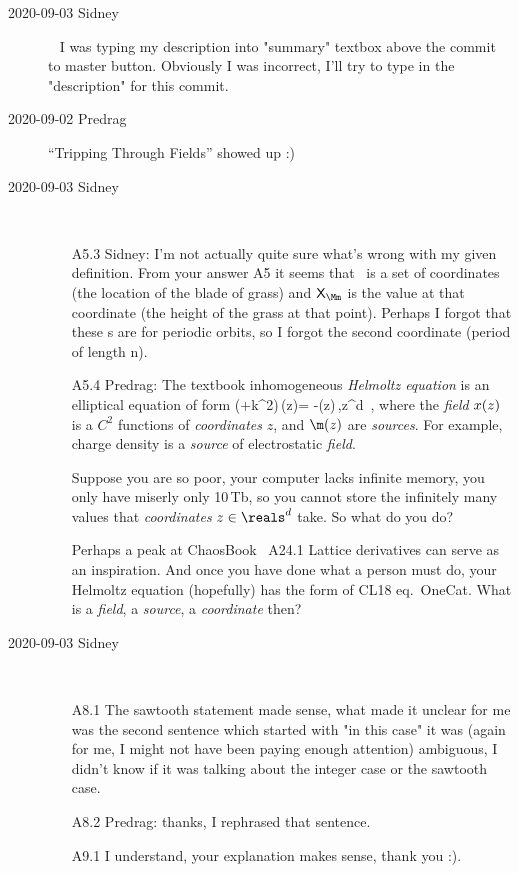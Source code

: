 \begin{description}
\item[2020-09-03 Sidney]~
I was typing my description into "summary" textbox above the commit to
master button. Obviously I was incorrect, I'll try to type in the
"description" for this commit.

\item[2020-09-02 Predrag]
``Tripping Through Fields'' showed up :)

\item[2020-09-03 Sidney]~~
\begin{itemize}
	\item[A5.3] Sidney:
I'm not actually quite sure what's wrong with my given definition. From
your answer A5 it seems that \Mm\ is a set of
coordinates (the location of the blade of grass) and $\Xx_\Mm$ is
the value at that coordinate (the height of the grass at that point).
Perhaps I forgot that these {\lattstate}s are for periodic orbits, so I
forgot the second coordinate (period of length n).
	\item[A5.4] Predrag: %
The textbook inhomogeneous \emph{Helmoltz equation} is an elliptical
equation of form
\beq
   (\Box+k^2)\,\ssp(z)= -\m(z)\,,\qquad z\in \reals^d
\,,
\label{CatMapContinuesPC}
\eeq
where the \emph{field} $x(z)$ is a $C^2$ functions of
\emph{coordinates} $z$, and $\m(z)$ are \emph{sources}. For example,
charge density is a \emph{source} of electrostatic \emph{field}.

Suppose you are so poor, your computer lacks infinite memory, you only
have miserly only 10\,Tb, so you cannot store the infinitely many values
that \emph{coordinates} $z\in \reals^d$ take. So what do you do?

Perhaps a peak at ChaosBook
 {~A24.1
Lattice derivatives} can serve as an inspiration. And once you have done
what a person must do, your Helmoltz equation (hopefully) has the form of
CL18 eq.~{OneCat}.
What is a \emph{field}, a \emph{source}, a \emph{coordinate} then?
\end{itemize}


\item[2020-09-03 Sidney]~~
\begin{itemize}
	\item[A8.1]
The sawtooth statement made sense, what made it unclear for me was the second sentence which started with "in this case" it was (again for me, I might not have been paying enough attention) ambiguous, I didn't know if it was talking about the integer case or the sawtooth case.  	
	\item[A8.2] Predrag: thanks, I rephrased that sentence.
	\item[A9.1]
I understand, your explanation makes sense, thank you :).
\end{itemize}


\end{description}
